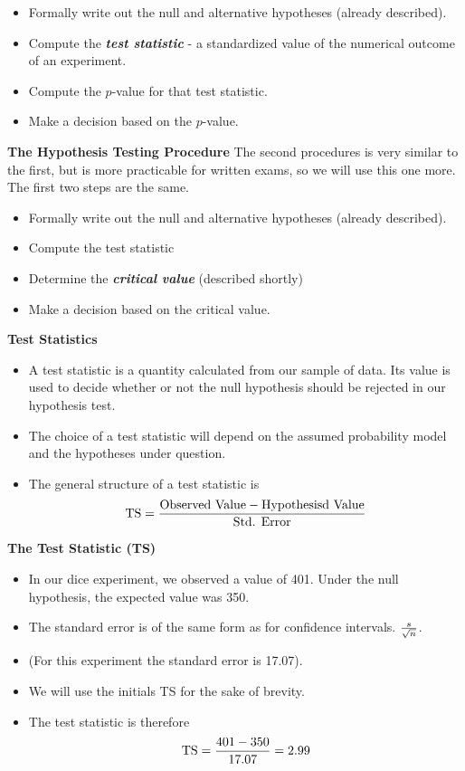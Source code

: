 \begin{itemize}
\item Formally write out the null and alternative hypotheses (already described).
\item Compute the \emph{\textbf{test statistic}} - a standardized value of the numerical outcome of an experiment.
\item Compute the $p$-value for that test statistic.
\item Make a decision based on the $p$-value.
\end{itemize}




\noindent \textbf{The Hypothesis Testing Procedure }
The second procedures is very similar to the first, but is more practicable for written exams, so we will use this one more. The first two steps are the same.

\begin{itemize}
\item Formally write out the null and alternative hypotheses (already described).
\item Compute the test statistic
\item Determine the \emph{\textbf{critical value}} (described shortly)
\item Make a decision based on the critical value.
\end{itemize}




\noindent \textbf{Test Statistics}
\begin{itemize}
\item A test statistic is a quantity calculated from our sample of data. Its value is used to decide whether or not the null hypothesis should be rejected in our hypothesis test.
\item The choice of a test statistic will depend on the assumed probability model and the hypotheses under question.
    \item The general structure of a test statistic is
\[ \mbox{TS}  = {\mbox{Observed Value} - \mbox{Hypothesisd Value}  \over \mbox{Std. Error}}\]
\end{itemize}


\noindent \textbf{The Test Statistic (TS)}
\begin{itemize}

\item In our dice experiment, we observed a value of 401. Under the null hypothesis, the expected value was 350.
\item The standard error is of the same form as for confidence intervals. $s \over \sqrt{n}$.
\item (For this experiment the standard error is 17.07).
\item We will use the initials TS for the sake of brevity.
\item The test statistic is therefore \[ \mbox{TS}  = {401 - 350  \over 17.07} = 2.99 \]
\end{itemize}


